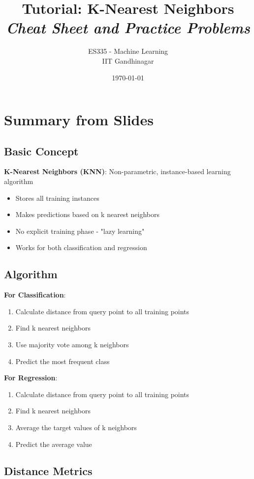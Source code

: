 \documentclass{article}
\title{\textbf{Tutorial: K-Nearest Neighbors} \\ \textit{Cheat Sheet and Practice Problems}}
\author{ES335 - Machine Learning \\ IIT Gandhinagar}
\date{\today}
\begin{document}
\maketitle

\section{Summary from Slides}

\subsection{Basic Concept}

\textbf{K-Nearest Neighbors (KNN)}: Non-parametric, instance-based learning algorithm
\begin{itemize}
    \item Stores all training instances
    \item Makes predictions based on k nearest neighbors
    \item No explicit training phase - "lazy learning"
    \item Works for both classification and regression
\end{itemize}

\subsection{Algorithm}

\textbf{For Classification}:
\begin{enumerate}
    \item Calculate distance from query point to all training points
    \item Find k nearest neighbors
    \item Use majority vote among k neighbors
    \item Predict the most frequent class
\end{enumerate}

\textbf{For Regression}:
\begin{enumerate}
    \item Calculate distance from query point to all training points
    \item Find k nearest neighbors
    \item Average the target values of k neighbors
    \item Predict the average value
\end{enumerate}

\subsection{Distance Metrics}
\end{document}
